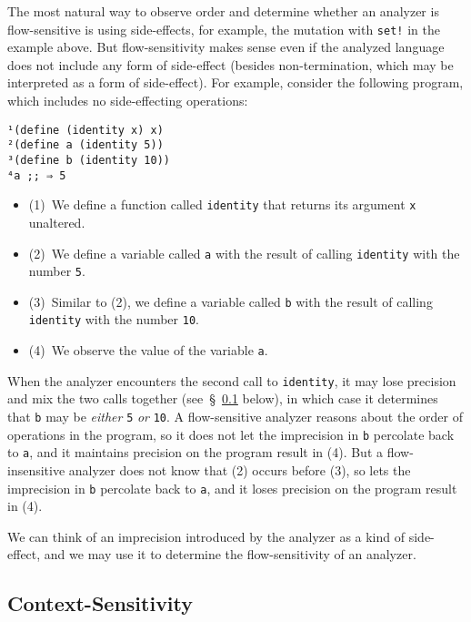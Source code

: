 \documentclass[12pt, oneside]{book}
\begin{document}
The most natural way to observe order and determine whether an analyzer is flow-sensitive is using side-effects, for example, the mutation with \texttt{set!} in the example above. But flow-sensitivity makes sense even if the analyzed language does not include any form of side-effect (besides non-termination, which may be interpreted as a form of side-effect). For example, consider the following program, which includes no side-effecting operations:

\begin{Verbatim}
¹(define (identity x) x)
²(define a (identity 5))
³(define b (identity 10))
⁴a ;; ⇒ 5
\end{Verbatim}

\begin{itemize}
  \item (1)~We define a function called \texttt{identity} that returns its argument \texttt{x} unaltered.
  \item (2)~We define a variable called \texttt{a} with the result of calling \texttt{identity} with the number \texttt{5}.
  \item (3)~Similar to (2), we define a variable called \texttt{b} with the result of calling \texttt{identity} with the number \texttt{10}.
  \item (4)~We observe the value of the variable \texttt{a}.
\end{itemize}

When the analyzer encounters the second call to \texttt{identity}, it may lose precision and mix the two calls together (see~§~\ref{section:context-sensitivity} below), in which case it determines that \texttt{b} may be \emph{either} \texttt{5} \emph{or} \texttt{10}. A flow-sensitive analyzer reasons about the order of operations in the program, so it does not let the imprecision in \texttt{b} percolate back to \texttt{a}, and it maintains precision on the program result in (4). But a flow-insensitive analyzer does not know that (2) occurs before (3), so lets the imprecision in \texttt{b} percolate back to \texttt{a}, and it loses precision on the program result in (4).

We can think of an imprecision introduced by the analyzer as a kind of side-effect, and we may use it to determine the flow-sensitivity of an analyzer.

\subsection{Context-Sensitivity}
\label{section:context-sensitivity}
\end{document}
